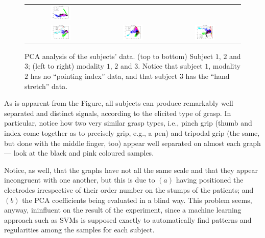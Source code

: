\begin{figure}[!ht]
\begin{tabular}{ccc}
    \includegraphics[width=0.3\textwidth]{figs/data23} \\
    \includegraphics[width=0.3\textwidth]{figs/data31} &
    \includegraphics[width=0.3\textwidth]{figs/data32} &
    \includegraphics[width=0.3\textwidth]{figs/data33} \\
  \end{tabular}
  \caption{ PCA analysis of the subjects' data. (top to bottom)
    Subject $1$, $2$ and $3$; (left to right) modality $1$, $2$ and
    $3$. Notice that subject $1$, modality $2$ has no ``pointing
    index'' data, and that subject $3$ has the ``hand stretch'' data.}
  \label{fig:PCA}
\end{figure}

As is apparent from the Figure, all subjects can produce remarkably
well separated and distinct signals, according to the elicited type of
grasp. In particular, notice how two very similar grasp types, i.e.,
pinch grip (thumb and index come together as to precisely grip, e.g.,
a pen) and tripodal grip (the same, but done with the middle finger,
too) appear well separated on almost each graph --- look at the black
and pink coloured samples.

Notice, as well, that the graphs have not all the same scale and that
they appear incongruent with one another, but this is due to $(a)$
having positioned the electrodes irrespective of their order number on
the stumps of the patients; and $(b)$ the PCA coefficients being
evaluated in a blind way. This problem seems, anyway, ininfluent on
the result of the experiment, since a machine learning approach such
as SVMs is supposed exactly to automatically find patterns and
regularities among the samples for each subject.

